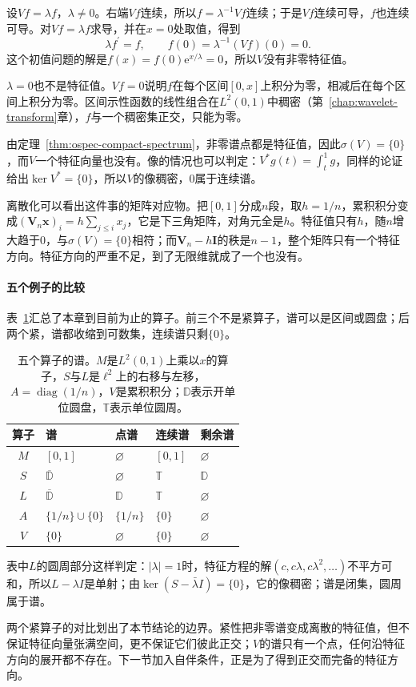 设$Vf=\lambda f$，$\lambda\neq0$。右端$Vf$连续，所以$f=\lambda^{-1}Vf$连续；于是$Vf$连续可导，$f$也连续可导。对$Vf=\lambda f$求导，并在$x=0$处取值，得到
\[
\lambda f^\prime=f,\qquad f(0)=\lambda^{-1}(Vf)(0)=0.
\]
这个初值问题的解是$f(x)=f(0)\mathrm e^{x/\lambda}=0$，所以$V$没有非零特征值。

$\lambda=0$也不是特征值。$Vf=0$说明$f$在每个区间$[0,x]$上积分为零，相减后在每个区间上积分为零。区间示性函数的线性组合在$L^2(0,1)$中稠密（第~\ref{chap:wavelet-transform}章），$f$与一个稠密集正交，只能为零。

由定理~\ref{thm:ospec-compact-spectrum}，非零谱点都是特征值，因此$\sigma(V)=\{0\}$，而$V$一个特征向量也没有。像的情况也可以判定：$V^*g(t)=\int_t^1g$，同样的论证给出$\ker V^*=\{0\}$，所以$V$的像稠密，$0$属于连续谱。

离散化可以看出这件事的矩阵对应物。把$[0,1]$分成$n$段，取$h=1/n$，累积积分变成$(\bm V_n\bm x)_i=h\sum_{j\leq i}x_j$，它是下三角矩阵，对角元全是$h$。特征值只有$h$，随$n$增大趋于$0$，与$\sigma(V)=\{0\}$相符；而$\bm V_n-h\bm I$的秩是$n-1$，整个矩阵只有一个特征方向。特征方向的严重不足，到了无限维就成了一个也没有。

\paragraph{五个例子的比较}
表~\ref{tab:ospec-gallery}汇总了本章到目前为止的算子。前三个不是紧算子，谱可以是区间或圆盘；后两个紧，谱都收缩到可数集，连续谱只剩$\{0\}$。

\begin{table}[!htb]
  \centering
  \caption{五个算子的谱。$M$是$L^2(0,1)$上乘以$x$的算子，$S$与$L$是$\ell^2$上的右移与左移，$A=\operatorname{diag}(1/n)$，$V$是累积积分；$\mathbb D$表示开单位圆盘，$\mathbb T$表示单位圆周。}
  \label{tab:ospec-gallery}
  \begin{tabular}{@{}cllll@{}}
    \toprule
    算子 & 谱 & 点谱 & 连续谱 & 剩余谱\\
    \midrule
    $M$ & $[0,1]$ & $\varnothing$ & $[0,1]$ & $\varnothing$\\
    $S$ & $\overline{\mathbb D}$ & $\varnothing$ & $\mathbb T$ & $\mathbb D$\\
    $L$ & $\overline{\mathbb D}$ & $\mathbb D$ & $\mathbb T$ & $\varnothing$\\
    $A$ & $\{1/n\}\cup\{0\}$ & $\{1/n\}$ & $\{0\}$ & $\varnothing$\\
    $V$ & $\{0\}$ & $\varnothing$ & $\{0\}$ & $\varnothing$\\
    \bottomrule
  \end{tabular}
\end{table}

表中$L$的圆周部分这样判定：$\lvert\lambda\rvert=1$时，特征方程的解$(c,c\lambda,c\lambda^2,\ldots)$不平方可和，所以$L-\lambda I$是单射；由$\ker(S-\bar\lambda I)=\{0\}$，它的像稠密；谱是闭集，圆周属于谱。

两个紧算子的对比划出了本节结论的边界。紧性把非零谱变成离散的特征值，但不保证特征向量张满空间，更不保证它们彼此正交；$V$的谱只有一个点，任何沿特征方向的展开都不存在。下一节加入自伴条件，正是为了得到正交而完备的特征方向。
